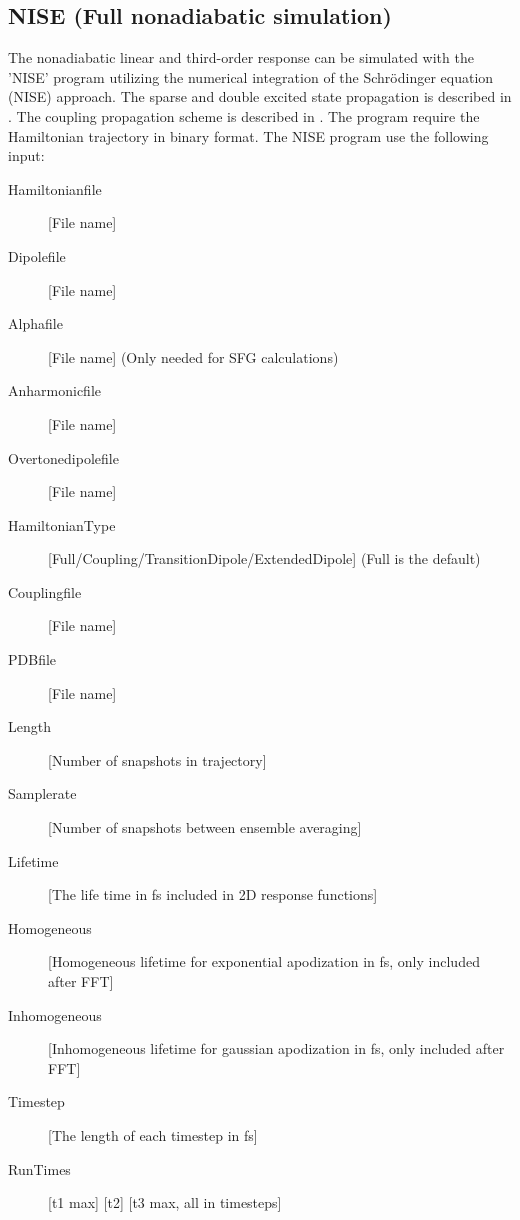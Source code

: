 \subsection{NISE (Full nonadiabatic simulation)}
The nonadiabatic linear and third-order response can be simulated with the 'NISE' program utilizing the numerical integration of the Schr\"odinger equation (NISE) approach\cite{Jansen.2006.JPCB.110.22910,Jansen.2009.ACR.42.1405}. The sparse and double excited state propagation is described in \cite{Jansen.2010.JCP.132.224503}.
The coupling propagation scheme is described in \cite{Liang.2012.JCTC.8.1706}.
The program require the Hamiltonian trajectory in binary format.
The NISE program use the following input:\\
\begin{description}
\item [Hamiltonianfile] [File name]
\item [Dipolefile] [File name]
\item [Alphafile] [File name] (Only needed for SFG calculations)
\item [Anharmonicfile] [File name]
\item [Overtonedipolefile] [File name]
\item [HamiltonianType] [Full/Coupling/TransitionDipole/ExtendedDipole] (Full is the default)
\item [Couplingfile] [File name]
\item [PDBfile] [File name]
\item [Length] [Number of snapshots in trajectory] 
\item [Samplerate] [Number of snapshots between ensemble averaging]
\item [Lifetime] [The life time in fs included in 2D response functions]
\item [Homogeneous] [Homogeneous lifetime for exponential apodization in fs, only included after FFT]
\item [Inhomogeneous] [Inhomogeneous lifetime for gaussian apodization in fs, only included after FFT]
\item [Timestep] [The length of each timestep in fs]
\item [RunTimes] [t1 max] [t2] [t3 max, all in timesteps]

\end{description}
